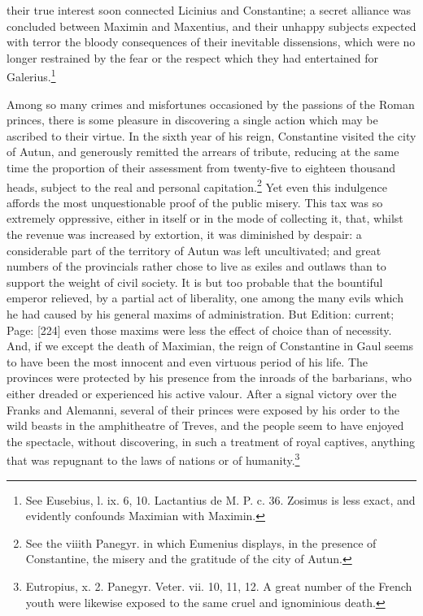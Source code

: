 their true interest soon connected Licinius and Constantine; a secret alliance was concluded between Maximin and Maxentius, and their unhappy subjects expected with terror the bloody consequences of their inevitable dissensions, which were no longer restrained by the fear or the respect which they had entertained for Galerius.\footnote{See Eusebius, l. ix. 6, 10. Lactantius de M. P. c. 36. Zosimus is less exact, and evidently confounds Maximian with Maximin.}

Among so many crimes and misfortunes occasioned by the passions of the Roman princes, there is some pleasure in discovering a single action which may be ascribed to their virtue. In the sixth year of his reign, Constantine visited the city of Autun, and generously remitted the arrears of tribute, reducing at the same time the proportion of their assessment from twenty-five to eighteen thousand heads, subject to the real and personal capitation.\footnote{See the viiith Panegyr. in which Eumenius displays, in the presence of Constantine, the misery and the gratitude of the city of Autun.} Yet even this indulgence affords the most unquestionable proof of the public misery. This tax was so extremely oppressive, either in itself or in the mode of collecting it, that, whilst the revenue was increased by extortion, it was diminished by despair: a considerable part of the territory of Autun was left uncultivated; and great numbers of the provincials rather chose to live as exiles and outlaws than to support the weight of civil society. It is but too probable that the bountiful emperor relieved, by a partial act of liberality, one among the many evils which he had caused by his general maxims of administration. But Edition: current; Page: [224] even those maxims were less the effect of choice than of necessity. And, if we except the death of Maximian, the reign of Constantine in Gaul seems to have been the most innocent and even virtuous period of his life. The provinces were protected by his presence from the inroads of the barbarians, who either dreaded or experienced his active valour. After a signal victory over the Franks and Alemanni, several of their princes were exposed by his order to the wild beasts in the amphitheatre of Treves, and the people seem to have enjoyed the spectacle, without discovering, in such a treatment of royal captives, anything that was repugnant to the laws of nations or of humanity.\footnote{Eutropius, x. 2. Panegyr. Veter. vii. 10, 11, 12. A great number of the French youth were likewise exposed to the same cruel and ignominious death.}


